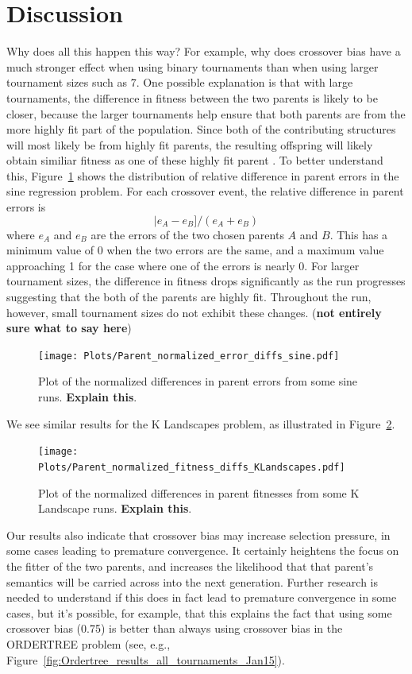 \documentclass{sig-alternate}
\begin{document}
\section{Discussion} \label{sec:Discussion}

Why does all this happen this way? For example, why does crossover bias have a much stronger effect when using binary
tournaments than when using larger tournament sizes such as 7. One possible explanation is that with large tournaments,
the difference in fitness between the two parents is likely to be closer, because the larger tournaments help ensure
that both parents are from the more highly fit part of the population. Since both of the contributing structures will most likely be from highly fit parents, the resulting offspring will likely obtain similiar fitness as one of these highly fit parent .  To better understand this, Figure~\ref{fig:parentDiffsSine} shows the distribution of relative difference in parent errors in the sine regression 
problem. For each crossover event, the relative difference in parent errors is
\[
	|e_A - e_B] / (e_A + e_B)
\]
where $e_A$ and $e_B$ are the errors of the two chosen parents $A$ and $B$. This has a minimum value of 0 when 
the two errors are the same, and a maximum value approaching 1 for the case where one of the errors is nearly 0. For larger tournament sizes, the difference in fitness drops significantly as the run progresses suggesting that the both of the parents are highly fit. Throughout the run, however, small tournament sizes do not exhibit these changes. (\textbf{not entirely sure what to say here})

\begin{figure}
\centering
\texttt{[image: Plots/Parent\_normalized\_error\_diffs\_sine.pdf]}
\caption{Plot of the normalized differences in parent errors from some sine runs. \textbf{Explain this}.}
\label{fig:parentDiffsSine}
\end{figure}

We see similar results for the K Landscapes problem, as illustrated in Figure~\ref{fig:parentDiffsKLandscapes}.

\begin{figure}
\centering
\texttt{[image: Plots/Parent\_normalized\_fitness\_diffs\_KLandscapes.pdf]}
\caption{Plot of the normalized differences in parent fitnesses from some K Landscape runs. \textbf{Explain this}.}
\label{fig:parentDiffsKLandscapes}
\end{figure}

Our results also indicate that crossover bias may increase selection pressure, in some cases
leading to premature convergence.
It certainly heightens the focus on the fitter of the two parents, and increases the likelihood
that that parent's semantics will be carried across into the next generation. Further research is
needed to understand if this does in fact lead to premature convergence in some cases, but it's
possible, for example, that this explains the fact that using some crossover bias (0.75) is better 
than always using crossover bias in the ORDERTREE problem (see, e.g., 
Figure~\ref{fig:Ordertree_results_all_tournaments_Jan15}).
\end{document}
